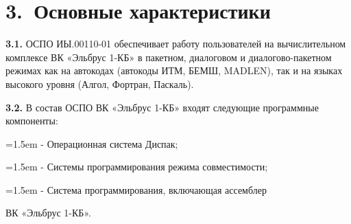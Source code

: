 \documentclass[11pt,a4paper]{article}
\begin{document}
\section*{3.~Основные характеристики}
\par\textbf{3.1.} ОСПО ИЫ.00110-01 обеспечивает работу пользователей на вычислительном комплексе ВК «Эльбрус 1-КБ» в пакетном, диалоговом и диалогово-пакетном режимах как на автокодах (автокоды ИТМ, БЕМШ, MADLEN), так и на языках высокого уровня (Алгол, Фортран, Паскаль).\par
\par\textbf{3.2.} В состав ОСПО ВК «Эльбрус 1-КБ» входят следующие программные компоненты:\par
\par\hangindent=1.5em - Операционная система Диспак;\par
\par\hangindent=1.5em - Системы программирования режима совместимости;\par
\par\hangindent=1.5em - Система программирования, включающая ассемблер\par
ВК «Эльбрус 1-КБ».
\end{document}
